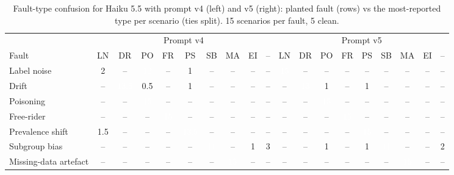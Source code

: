\begin{table}[t]
\centering
\small
\setlength{\tabcolsep}{3pt}
\caption{Fault-type confusion for Haiku 5.5 with prompt v4 (left) and v5 (right): planted fault (rows) vs the most-reported type per scenario (ties split). 15 scenarios per fault, 5 clean.}
\label{tab:confusion}
\begin{tabular}{l|ccccccccc|ccccccccc}
\toprule
 & \multicolumn{9}{c}{Prompt v4} & \multicolumn{9}{c}{Prompt v5} \\
Fault & LN & DR & PO & FR & PS & SB & MA & EI & – & LN & DR & PO & FR & PS & SB & MA & EI & – \\
\midrule
Label noise & \cellcolor[RGB]{167,203,245}2 & -- & \cellcolor[RGB]{27,84,157}\textcolor{white}{12} & -- & \cellcolor[RGB]{186,214,248}1 & -- & -- & -- & -- & \cellcolor[RGB]{13,54,107}\textcolor{white}{15} & -- & -- & -- & -- & -- & -- & -- & -- \\
Drift & -- & \cellcolor[RGB]{20,69,132}\textcolor{white}{13.5} & \cellcolor[RGB]{196,220,250}0.5 & -- & \cellcolor[RGB]{186,214,248}1 & -- & -- & -- & -- & -- & \cellcolor[RGB]{22,74,141}\textcolor{white}{13} & \cellcolor[RGB]{186,214,248}1 & -- & \cellcolor[RGB]{186,214,248}1 & -- & -- & -- & -- \\
Poisoning & -- & -- & \cellcolor[RGB]{13,54,107}\textcolor{white}{15} & -- & -- & -- & -- & -- & -- & -- & -- & \cellcolor[RGB]{13,54,107}\textcolor{white}{15} & -- & -- & -- & -- & -- & -- \\
Free-rider & -- & -- & -- & \cellcolor[RGB]{13,54,107}\textcolor{white}{15} & -- & -- & -- & -- & -- & -- & -- & -- & \cellcolor[RGB]{13,54,107}\textcolor{white}{15} & -- & -- & -- & -- & -- \\
Prevalence shift & \cellcolor[RGB]{177,209,247}1.5 & -- & -- & -- & \cellcolor[RGB]{20,69,132}\textcolor{white}{13.5} & -- & -- & -- & -- & -- & -- & -- & -- & \cellcolor[RGB]{13,54,107}\textcolor{white}{15} & -- & -- & -- & -- \\
Subgroup bias & -- & -- & -- & -- & -- & \cellcolor[RGB]{32,95,174}\textcolor{white}{11} & -- & \cellcolor[RGB]{186,214,248}1 & \cellcolor[RGB]{148,191,242}3 & -- & -- & \cellcolor[RGB]{186,214,248}1 & -- & \cellcolor[RGB]{186,214,248}1 & \cellcolor[RGB]{32,95,174}\textcolor{white}{11} & -- & -- & \cellcolor[RGB]{167,203,245}2 \\
Missing-data artefact & -- & -- & -- & -- & -- & -- & \cellcolor[RGB]{13,54,107}\textcolor{white}{15} & -- & -- & -- & -- & -- & -- & -- & -- & \cellcolor[RGB]{13,54,107}\textcolor{white}{15} & -- & -- \\

\end{tabular}
\end{table}
